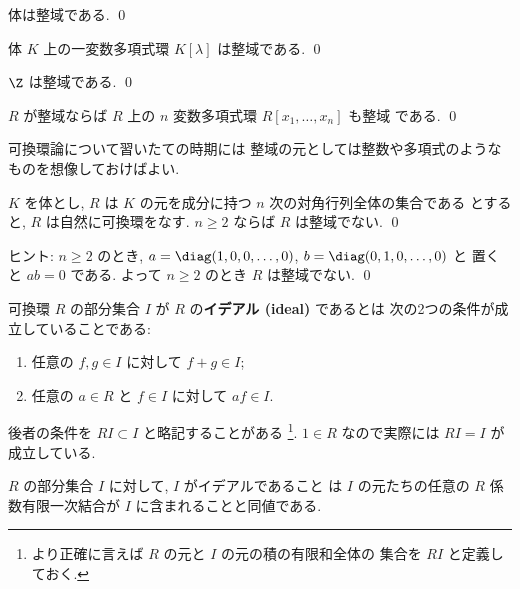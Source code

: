 \documentclass[12pt,twoside]{jarticle}
\begin{document}

\begin{question}
  体は整域である. \qed
\end{question}

\begin{question}
  体 $K$ 上の一変数多項式環 $K[\lambda]$ は整域である.
  \qed
\end{question}

\begin{question}
  $\Z$ は整域である.
  \qed
\end{question}

\begin{question}
  $R$ が整域ならば $R$ 上の $n$ 変数多項式環 $R[x_1,\dots,x_n]$ も整域
  である.  \qed
\end{question}

可換環論について習いたての時期には
整域の元としては整数や多項式のようなものを想像しておけばよい.


\begin{question}
  $K$ を体とし, $R$ は $K$ の元を成分に持つ $n$ 次の対角行列全体の集合である
  とすると, $R$ は自然に可換環をなす. $n\ge 2$ ならば $R$ は整域でない. 
  \qed
\end{question}

\noindent
ヒント: $n\ge 2$ のとき, 
$a=\diag(1,0,0,\ldots,0)$, $b=\diag(0,1,0,\ldots,0)$ と
置くと $ab=0$ である.  よって $n\ge 2$ のとき $R$ は整域でない.
\qed

\bigskip

可換環 $R$ の部分集合 $I$ が $R$ の{\bf イデアル (ideal)} であるとは
次の2つの条件が成立していることである:
\begin{enumerate}
\item 任意の $f,g\in I$ に対して $f+g\in I$;
\item 任意の $a\in R$ と $f\in I$ に対して $af\in I$.
\end{enumerate}
後者の条件を $RI\subset I$ と略記することがある%
\footnote{より正確に言えば $R$ の元と $I$ の元の積の有限和全体の
  集合を $RI$ と定義しておく.}.
$1\in R$ なので実際には $RI=I$ が成立している.

$R$ の部分集合 $I$ に対して, $I$ がイデアルであること
は $I$ の元たちの任意の $R$ 係数有限一次結合が $I$ に含まれることと同値である.

\end{document}
